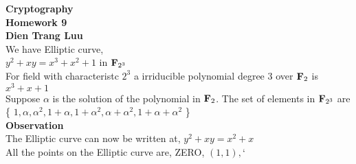 


\noindent
{\bf
Cryptography\\
Homework 9\\
Dien Trang Luu}\\

\noindent
We have Elliptic curve,\\
$y^2 + xy = x^3 + x^2 + 1$
in ${\bf F}_{2^3}$\\

For field with characteristc $2^3$ a irriducible polynomial degree $3$
over ${\bf F}_2$ is $x^3 + x + 1$\\

Suppose $\alpha$ is the solution of the polynomial in ${\bf F}_2$. The
set of elements in ${\bf F}_{2^3}$ are \{
$1, \alpha, \alpha^2, 1 + \alpha, 1 + \alpha^2, \alpha + \alpha^2, 1 + \alpha + \alpha^2$
\}\\

\noindent
{\bf Observation} \\
The Elliptic curve can now be written at, $y^2 + xy = x^2 + x$ \\
\noindent
All the points on the Elliptic curve are,
ZERO, $(1,1), $`

